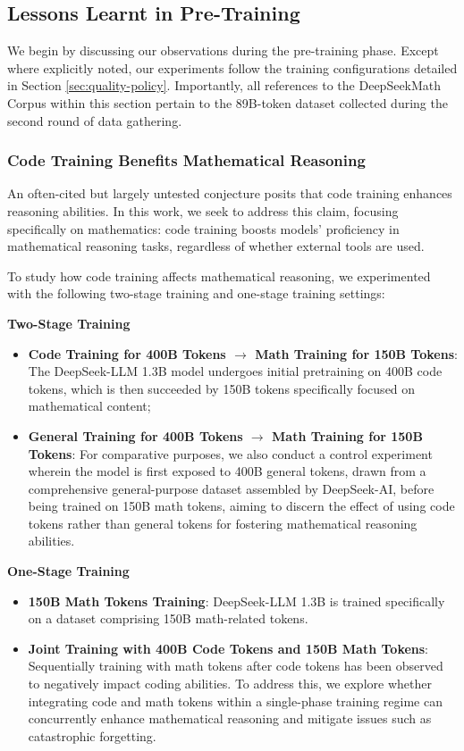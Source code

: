 \begin{itemize}[topsep=0pt]
\subsection{Lessons Learnt in Pre-Training}

We begin by discussing our observations during the pre-training phase. Except where explicitly noted, our experiments follow the training configurations detailed in Section \ref{sec:quality-policy}. Importantly, all references to the DeepSeekMath Corpus within this section pertain to the 89B-token dataset collected during the second round of data gathering.

\subsubsection{Code Training Benefits Mathematical Reasoning}

An often-cited but largely untested conjecture posits that code training enhances reasoning abilities. In this work, we seek to address this claim, focusing specifically on mathematics: code training boosts models’ proficiency in mathematical reasoning tasks, regardless of whether external tools are used.

To study how code training affects mathematical reasoning, we experimented with the following two-stage training and one-stage training settings:

\textbf{Two-Stage Training}

\begin{itemize}[topsep=0pt]
    \item \textbf{Code Training for 400B Tokens $\rightarrow$ Math Training for 150B Tokens}: The DeepSeek-LLM 1.3B model undergoes initial pretraining on 400B code tokens, which is then succeeded by 150B tokens specifically focused on mathematical content;
    \item \textbf{General Training for 400B Tokens $\rightarrow$ Math Training for 150B Tokens}: For comparative purposes, we also conduct a control experiment wherein the model is first exposed to 400B general tokens, drawn from a comprehensive general-purpose dataset assembled by DeepSeek-AI, before being trained on 150B math tokens, aiming to discern the effect of using code tokens rather than general tokens for fostering mathematical reasoning abilities.
\end{itemize}

\textbf{One-Stage Training}

\begin{itemize}[topsep=0pt]
    \item \textbf{150B Math Tokens Training}: DeepSeek-LLM 1.3B is trained specifically on a dataset comprising 150B math-related tokens.
    \item \textbf{Joint Training with 400B Code Tokens and 150B Math Tokens}: Sequentially training with math tokens after code tokens has been observed to negatively impact coding abilities. To address this, we explore whether integrating code and math tokens within a single-phase training regime can concurrently enhance mathematical reasoning and mitigate issues such as catastrophic forgetting.
\end{itemize}


\end{itemize}

